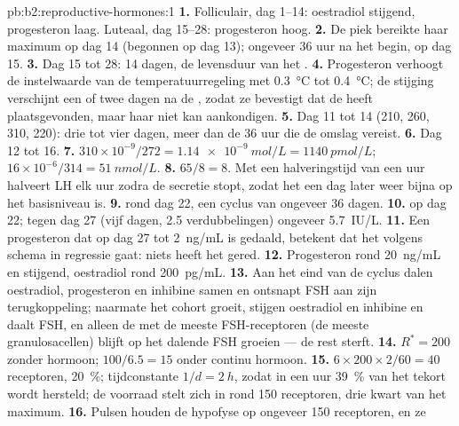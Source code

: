 \begin{solution}{pb:b2:reproductive-hormones:1}
\textbf{1.} Folliculair, dag 1--14: oestradiol stijgend, progesteron laag.
Luteaal, dag 15--28: progesteron hoog.
\textbf{2.} De piek bereikte haar maximum op dag 14 (begonnen op dag 13);
 ongeveer 36 uur na het begin, op dag 15.
\textbf{3.} Dag 15 tot 28: 14 dagen, de levensduur van het .
\textbf{4.} Progesteron verhoogt de instelwaarde van de temperatuurregeling
met \qty{0.3}{\celsius} tot \qty{0.4}{\celsius}; de stijging verschijnt een
of twee dagen na de , zodat ze bevestigt dat de  heeft
plaatsgevonden, maar haar niet kan aankondigen.
\textbf{5.} Dag 11 tot 14 (210, 260, 310, 220): drie tot vier dagen, meer
dan de 36 uur die de omslag vereist.
\textbf{6.} Dag 12 tot 16.
\textbf{7.} $310\times 10^{-9}/272 = \qty{1.14e-9}{mol/L} =
\qty{1140}{pmol/L}$; $16\times 10^{-6}/314 = \qty{51}{nmol/L}$.
\textbf{8.} $65/8 = 8$. Met een halveringstijd van een uur halveert LH elk
uur zodra de secretie stopt, zodat het een dag later weer bijna op het
basisniveau is.
\textbf{9.}  rond dag 22, een cyclus van ongeveer 36 dagen.
\textbf{10.}  op dag 22; tegen dag 27 (vijf dagen, 2.5
verdubbelingen) ongeveer \qty{5.7}{IU/L}.
\textbf{11.} Een progesteron dat op dag 27 tot \qty{2}{ng/mL} is gedaald,
betekent dat het  volgens schema in regressie gaat: niets heeft
het gered.
\textbf{12.} Progesteron rond \qty{20}{ng/mL} en stijgend, oestradiol rond
\qty{200}{pg/mL}.
\textbf{13.} Aan het eind van de cyclus dalen oestradiol, progesteron en
inhibine samen en ontsnapt FSH aan zijn terugkoppeling; naarmate het cohort
groeit, stijgen oestradiol en inhibine en daalt FSH, en alleen de 
met de meeste FSH-receptoren (de meeste granulosacellen) blijft op het
dalende FSH groeien --- de rest sterft.
\textbf{14.} $R^* = 200$ zonder hormoon; $100/6.5 = 15$ onder
continu hormoon.
\textbf{15.} $6\times 200\times 2/60 = 40$ receptoren, \qty{20}{\%};
tijdconstante $1/d = \qty{2}{h}$, zodat in een uur \qty{39}{\%} van het
tekort wordt hersteld; de voorraad stelt zich in rond 150 receptoren, drie
kwart van het maximum.
\textbf{16.} Pulsen houden de hypofyse op ongeveer 150 receptoren, en ze

\end{solution}
